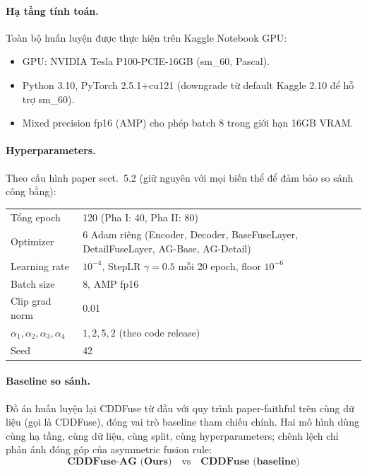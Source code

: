 \paragraph{Hạ tầng tính toán.}
Toàn bộ huấn luyện được thực hiện trên Kaggle Notebook GPU:
\begin{itemize}\itemsep0pt
    \item GPU: NVIDIA Tesla P100-PCIE-16GB (sm\_60, Pascal).
    \item Python 3.10, PyTorch 2.5.1+cu121 (downgrade từ default Kaggle 2.10 để hỗ trợ sm\_60).
    \item Mixed precision fp16 (AMP) cho phép batch 8 trong giới hạn 16GB VRAM.
\end{itemize}

\paragraph{Hyperparameters.}
Theo cấu hình paper sect.~5.2 (giữ nguyên với mọi biến thể để đảm bảo so sánh công bằng):
\begin{center}
\begin{tabular}{lp{}}
\toprule
Tổng epoch & 120 (Pha I: 40, Pha II: 80) \\
Optimizer  & 6 Adam riêng (Encoder, Decoder, BaseFuseLayer, DetailFuseLayer, AG-Base, AG-Detail) \\
Learning rate & $10^{-4}$, StepLR $\gamma = 0.5$ mỗi 20 epoch, floor $10^{-6}$ \\
Batch size & 8, AMP fp16 \\
Clip grad norm & 0.01 \\
$\alpha_1, \alpha_2, \alpha_3, \alpha_4$ & $1, 2, 5, 2$ (theo code release) \\
Seed & 42 \\
\bottomrule
\end{tabular}
\end{center}

\paragraph{Baseline so sánh.}
Đồ án huấn luyện lại CDDFuse từ đầu với quy trình paper-faithful trên cùng dữ liệu (gọi là CDDFuse), đóng vai trò baseline tham chiếu chính. Hai mô hình dùng cùng hạ tầng, cùng dữ liệu, cùng split, cùng hyperparameters; chênh lệch chỉ phản ánh đóng góp của asymmetric fusion rule:
\begin{equation*}
\boxed{\textbf{CDDFuse-AG (Ours)} \quad \text{vs} \quad \textbf{CDDFuse (baseline)}}
\end{equation*}

